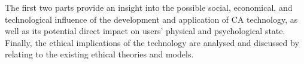 The first two parts provide an insight into the possible social, economical, and technological influence of the development and application of CA technology, as well as its potential direct impact on users' physical and psychological state. Finally, the ethical implications of the technology are analysed and discussed by relating to the existing ethical theories and models.



